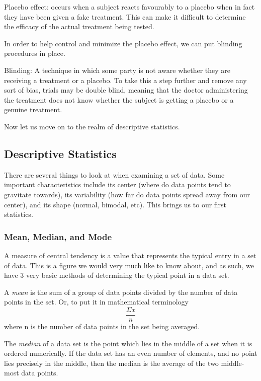 \begin{definition}
Placebo effect: occurs when a subject reacts favourably to a placebo when in fact they have been given a fake treatment. This can make it difficult to determine the efficacy of the actual treatment being tested.
\end{definition} 

In order to help control and minimize the placebo effect, we can put blinding procedures in place.

\begin{definition}
Blinding: A technique in which some party is not aware whether they are receiving a treatment or a placebo. To take this a step further and remove any sort of bias, trials may be double blind, meaning that the doctor administering the treatment does not know whether the subject is getting a placebo or a genuine treatment.
\end{definition} 

Now let us move on to the realm of descriptive statistics.

\subsection{Descriptive Statistics}

There are several things to look at when examining a set of data. Some important characteristics include its center (where do data points tend to gravitate towards), its variability (how far do data points spread away from our center), and its shape (normal, bimodal, etc). This brings us to our first statistics.

\subsubsection{Mean, Median, and Mode}
A measure of central tendency is a value that represents the typical entry in a set of data. This is a figure we would very much like to know about, and as such, we have 3 very basic methods of determining the typical point in a data set.\newline

A \emph{mean} is the sum of a group of data points divided by the number of data points in the set. Or, to put it in mathematical terminology $$ \frac{\Sigma{x}}{n}$$ where n is the number of data points in the set being averaged. \newline

The \emph{median} of a data set is the point which lies in the middle of a set when it is ordered numerically. If the data set has an even number of elements, and no point lies precisely in the middle, then the median is the average of the two middle-most data points.\newline

